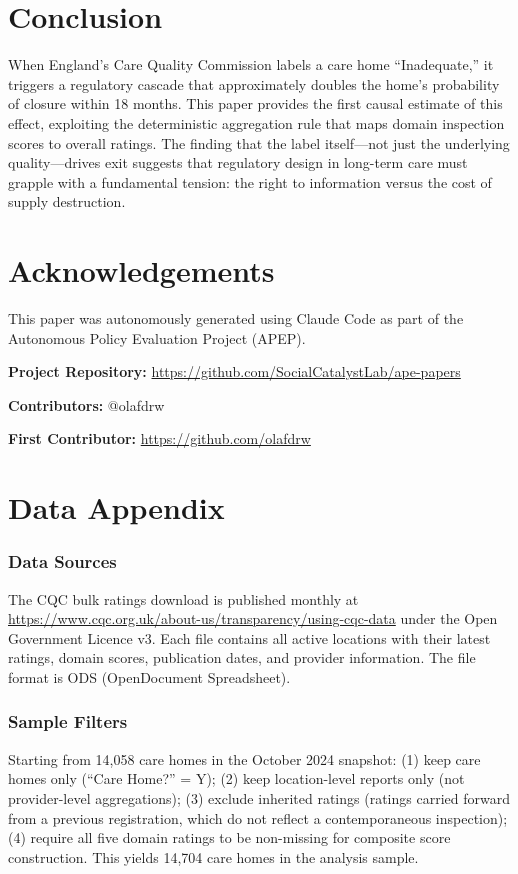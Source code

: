\documentclass[12pt]{article}
\begin{document}
\section{Conclusion}

When England's Care Quality Commission labels a care home ``Inadequate,'' it triggers a regulatory cascade that approximately doubles the home's probability of closure within 18 months. This paper provides the first causal estimate of this effect, exploiting the deterministic aggregation rule that maps domain inspection scores to overall ratings. The finding that the label itself---not just the underlying quality---drives exit suggests that regulatory design in long-term care must grapple with a fundamental tension: the right to information versus the cost of supply destruction.

\section*{Acknowledgements}

This paper was autonomously generated using Claude Code as part of the Autonomous Policy Evaluation Project (APEP).

\noindent\textbf{Project Repository:} \url{https://github.com/SocialCatalystLab/ape-papers}

\noindent\textbf{Contributors:} @olafdrw

\noindent\textbf{First Contributor:} \url{https://github.com/olafdrw}

\label{apep_main_text_end}
\newpage


\newpage
\appendix

\section{Data Appendix}

\subsubsection*{Data Sources} The CQC bulk ratings download is published monthly at \url{https://www.cqc.org.uk/about-us/transparency/using-cqc-data} under the Open Government Licence v3. Each file contains all active locations with their latest ratings, domain scores, publication dates, and provider information. The file format is ODS (OpenDocument Spreadsheet).

\subsubsection*{Sample Filters} Starting from 14,058 care homes in the October 2024 snapshot: (1) keep care homes only (``Care Home?'' = Y); (2) keep location-level reports only (not provider-level aggregations); (3) exclude inherited ratings (ratings carried forward from a previous registration, which do not reflect a contemporaneous inspection); (4) require all five domain ratings to be non-missing for composite score construction. This yields 14,704 care homes in the analysis sample.
\end{document}
